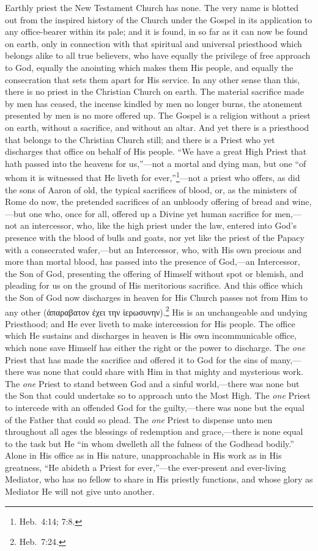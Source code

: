 \documentclass[
]{book}
\begin{document}
Earthly priest the New Testament Church has none. The very name is blotted out from the inspired history of the Church under the Gospel in its application to any office-bearer within its pale; and it is found, in so far as it can now be found on earth, only in connection with that spiritual and universal priesthood which belongs alike to all true believers, who have equally the privilege of free approach to God, equally the anointing which makes them His people, and equally the consecration that sets them apart for His service. In any other sense than this, there is no priest in the Christian Church on earth. The material sacrifice made by men has ceased, the incense kindled by men no longer burns, the atonement presented by men is no more offered up. The Gospel is a religion without a priest on earth, without a sacrifice, and without an altar. And yet there is a priesthood that belongs to the Christian Church still; and there is a Priest who yet discharges that office on behalf of His people. ``We have a great High Priest that hath passed into the heavens for us,''---not a mortal and dying man, but one ``of whom it is witnessed that He liveth for ever,''\footnote{Heb.~4:14; 7:8.}---not a priest who offers, as did the sons of Aaron of old, the typical sacrifices of blood, or, as the ministers of Rome do now, the pretended sacrifices of an unbloody offering of bread and wine,---but one who, once for all, offered up a Divine yet human sacrifice for men,---not an intercessor, who, like the high priest under the law, entered into God's presence with the blood of bulls and goats, nor yet like the priest of the Papacy with a consecrated wafer,---but an Intercessor, who, with His own precious and more than mortal blood, has passed into the presence of God,---an Intercessor, the Son of God, presenting the offering of Himself without spot or blemish, and pleading for us on the ground of His meritorious sacrifice. And this office which the Son of God now discharges in heaven for His Church passes not from Him to any other (\foreignlanguage{greek}{ἀπαραβατον ἐχει την ἱερωσυνην}).\footnote{Heb.~7:24.} His is an unchangeable and undying Priesthood; and He ever liveth to make intercession for His people. The office which He sustains and discharges in heaven is His own incommunicable office, which none save Himself has either the right or the power to discharge. The \emph{one} Priest that has made the sacrifice and offered it to God for the sins of many,---there was none that could share with Him in that mighty and mysterious work. The \emph{one} Priest to stand between God and a sinful world,---there was none but the Son that could undertake so to approach unto the Most High. The \emph{one} Priest to intercede with an offended God for the guilty,---there was none but the equal of the Father that could so plead. The \emph{one} Priest to dispense unto men throughout all ages the blessings of redemption and grace,---there is none equal to the task but He ``in whom dwelleth all the fulness of the Godhead bodily.'' Alone in His office as in His nature, unapproachable in His work as in His greatness, ``He abideth a Priest for ever,''---the ever-present and ever-living Mediator, who has no fellow to share in His priestly functions, and whose glory as Mediator He will not give unto another.
\end{document}
